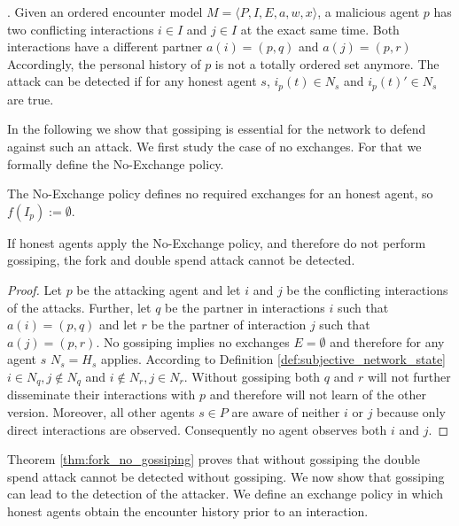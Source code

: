\begin{defn}. Given an ordered encounter model $M = \langle P, I, E, a, w, x \rangle$, a malicious agent $p$ has two conflicting interactions 
    $i \in I$ and $j \in I$ at the exact same time. Both interactions have a different partner $a(i) = (p, q)$ 
    and $a(j) = (p, r)$ Accordingly, the personal history  of $p$ is not a totally ordered set anymore.
    The attack can be detected if for any honest agent $s$, $i_p(t) \in N_{s}$ and $i_p(t)' \in N_{s}$ are
    true.
\end{defn}

In the following we show that gossiping is essential for the network to defend against such an 
attack. We first study the case of no exchanges. For that we formally define the No-Exchange policy.

\begin{pol}[No-Exchange]
    \label{pol:no-exchange}
    The No-Exchange policy defines no required exchanges for an honest agent, so $f(I_p) := \emptyset$.
\end{pol}


\begin{thm}
    \label{thm:fork_no_gossiping}
    If honest agents apply the No-Exchange policy, and therefore do not perform gossiping,
    the fork and double spend attack cannot be detected.
\end{thm}
\begin{proof}
    Let $p$ be the attacking agent and let $i$ and $j$ be the conflicting interactions of the 
    attacks. Further, let $q$ be the partner in interactions $i$ such that $a(i) = (p, q)$ and let 
    $r$ be the partner of interaction $j$ such that $a(j) = (p, r)$. 
    No gossiping implies no exchanges $E = \emptyset$ and therefore for any agent $s$ $N_s = H_s$
    applies. 
    According to Definition \ref{def:subjective_network_state} $i \in N_{q}, j \notin N_{q}$ and 
    $i \notin N_{r}, j \in N_{r}$. Without gossiping both $q$ and $r$ will not further disseminate 
    their interactions with $p$ and therefore will not learn of the other version.
    Moreover, all other agents $s \in P$ are aware of neither $i$ or $j$ because only direct 
    interactions are observed. Consequently no agent observes both $i$ and $j$.
\end{proof}

Theorem \ref{thm:fork_no_gossiping} proves that without gossiping the double spend attack cannot be
detected without gossiping. We now show that gossiping can lead to the detection of the attacker. We
define an exchange policy in which honest agents obtain the encounter history prior to an interaction.

